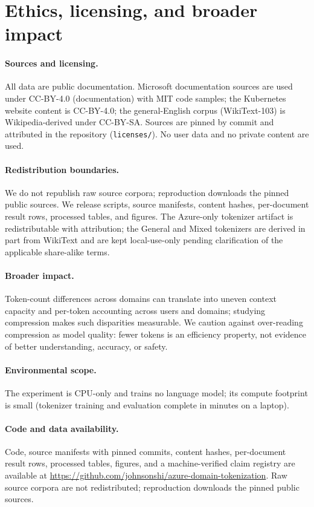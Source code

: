 \section{Ethics, licensing, and broader impact}
\label{sec:ethics}

\paragraph{Sources and licensing.} All data are public documentation. Microsoft
documentation sources are used under CC-BY-4.0 (documentation) with MIT code
samples; the Kubernetes website content is CC-BY-4.0; the general-English corpus
(WikiText-103) is Wikipedia-derived under CC-BY-SA. Sources are pinned by commit
and attributed in the repository (\texttt{licenses/}). No user data and no private
content are used.

\paragraph{Redistribution boundaries.} We do not republish raw source corpora;
reproduction downloads the pinned public sources. We release scripts, source
manifests, content hashes, per-document result rows, processed tables, and
figures. The Azure-only tokenizer artifact is redistributable with attribution;
the General and Mixed tokenizers are derived in part from WikiText and are kept
local-use-only pending clarification of the applicable share-alike terms.

\paragraph{Broader impact.} Token-count differences across domains can translate
into uneven context capacity and per-token accounting across users and domains;
studying compression makes such disparities measurable. We caution against
over-reading compression as model quality: fewer tokens is an efficiency property,
not evidence of better understanding, accuracy, or safety.

\paragraph{Environmental scope.} The experiment is CPU-only and trains no language
model; its compute footprint is small (tokenizer training and evaluation complete
in minutes on a laptop).

\paragraph{Code and data availability.} Code, source manifests with pinned
commits, content hashes, per-document result rows, processed tables, figures, and
a machine-verified claim registry are available at
\url{https://github.com/johnsonshi/azure-domain-tokenization}. Raw source corpora
are not redistributed; reproduction downloads the pinned public sources.

